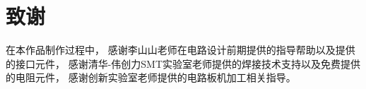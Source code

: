 
\section{致谢}
在本作品制作过程中，
感谢李山山老师在电路设计前期提供的指导帮助以及提供的接口元件，
感谢清华-伟创力SMT实验室老师提供的焊接技术支持以及免费提供的电阻元件，
感谢创新实验室老师提供的电路板机加工相关指导。


